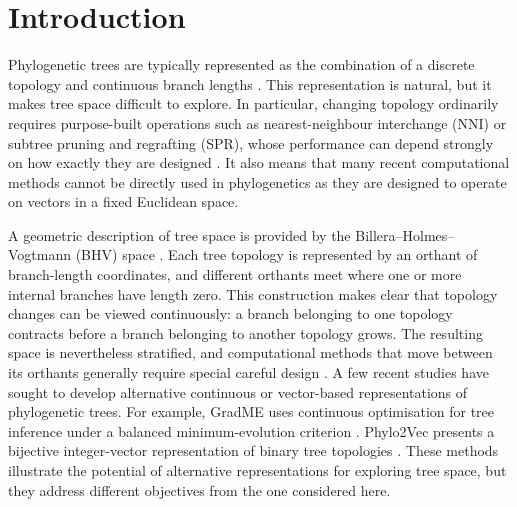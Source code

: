 \documentclass{article}
\begin{document}
\newpage
\section{Introduction}

Phylogenetic trees are typically represented as the combination of a discrete topology and continuous branch
lengths \citep{liebermanPhylogeneticsTheoryPractice2011}. 
This representation is natural, but it makes tree space difficult to explore. 
In particular, changing topology ordinarily requires
purpose-built operations such as nearest-neighbour interchange (NNI) or subtree pruning
and regrafting (SPR), whose performance can depend strongly on how exactly they are designed
\citep{hohnaGuidedTreeTopology2012,zhangUsingParsimonyGuidedTree2020,
meyerAdaptiveTreeProposals2021}.
It also means that 
many recent computational methods cannot be directly used in 
phylogenetics as they are designed to operate on vectors in a
fixed Euclidean space.

A geometric description of tree space is provided by the
Billera--Holmes--Vogtmann (BHV) space \citep{Billera2001}. Each tree topology
is represented by an orthant of branch-length coordinates, and different
orthants meet where one or more internal branches have length zero. This
construction makes clear that topology changes can be viewed continuously:
a branch belonging to one topology contracts before a branch belonging to
another topology grows. The resulting space is nevertheless stratified, and
computational methods that move between its orthants generally require
special careful design \citep{dinhProbabilisticPathHamiltonian2017,Helekal2025}.
A few recent studies have sought to develop alternative continuous or vector-based 
representations of phylogenetic trees. 
For example, GradME uses continuous optimisation for tree inference under a balanced minimum-evolution criterion \citep{pennLeapingTreeSpace2023}.
Phylo2Vec presents a bijective integer-vector representation of binary tree topologies \citep{pennPhylo2VecVectorRepresentation2025}. 
These methods illustrate the potential of alternative representations for exploring tree space, but they address different objectives from the one considered here.
\end{document}
